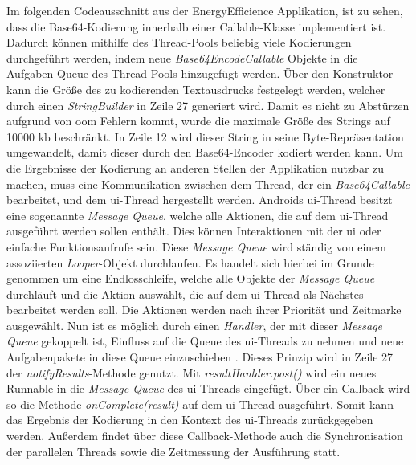 Im folgenden Codeausschnitt aus der \glqq EnergyEfficience\grqq{} Applikation, ist zu sehen, dass die Base64-Kodierung innerhalb einer Callable-Klasse implementiert ist. Dadurch können mithilfe des Thread-Pools beliebig viele Kodierungen durchgeführt werden, indem neue \emph{Base64EncodeCallable} Objekte in die Aufgaben-Queue des Thread-Pools hinzugefügt werden. Über den Konstruktor kann die Größe des zu kodierenden Textausdrucks festgelegt werden, welcher durch einen \emph{StringBuilder} in Zeile 27 generiert wird. Damit es nicht zu Abstürzen aufgrund von \ac{oom} Fehlern kommt, wurde die maximale Größe des Strings auf 10000 \ac{kb} beschränkt. In Zeile 12 wird dieser String in seine Byte-Repräsentation umgewandelt, damit dieser durch den Base64-Encoder kodiert werden kann. Um die Ergebnisse der Kodierung an anderen Stellen der Applikation nutzbar zu machen, muss eine Kommunikation zwischen dem Thread, der ein \emph{Base64Callable} bearbeitet, und dem \ac{ui}-Thread hergestellt werden.  Androids \ac{ui}-Thread besitzt eine sogenannte \emph{Message Queue}, welche alle Aktionen, die auf dem \ac{ui}-Thread ausgeführt werden sollen enthält. Dies können Interaktionen mit der \ac{ui} oder einfache Funktionsaufrufe sein. Diese \emph{Message Queue} wird ständig von einem assoziierten \emph{Looper}-Objekt durchlaufen. Es handelt sich hierbei im Grunde genommen um eine Endlosschleife, welche alle Objekte der \emph{Message Queue} durchläuft und die Aktion auswählt, die auf dem \ac{ui}-Thread als Nächstes bearbeitet werden soll. Die Aktionen werden nach ihrer Priorität und Zeitmarke ausgewählt. Nun ist es möglich durch einen \emph{Handler}, der mit dieser \emph{Message Queue} gekoppelt ist, Einfluss auf die Queue des \ac{ui}-Threads zu nehmen und neue Aufgabenpakete in diese Queue einzuschieben \cite{Handler}. Dieses Prinzip wird in Zeile 27 der \emph{notifyResults}-Methode genutzt. Mit \emph{resultHanlder.post()} wird ein neues Runnable in die \emph{Message Queue} des \ac{ui}-Threads eingefügt. Über ein Callback wird so die Methode \emph{onComplete(result)} auf dem \ac{ui}-Thread ausgeführt. Somit kann das Ergebnis der Kodierung in den Kontext des \ac{ui}-Threads zurückgegeben werden. Außerdem findet über diese Callback-Methode auch die Synchronisation der parallelen Threads sowie die Zeitmessung der Ausführung statt. 

